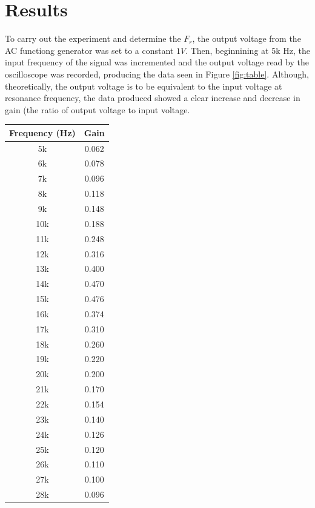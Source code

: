 \documentclass[journal]{IEEEtran}
\begin{document}
\section{Results}

\noindent To carry out the experiment and determine the $F_{r}$, the output voltage from the AC functiong generator was set to a constant $1V$. Then, beginnining at 5k Hz, the input frequency of the signal was incremented and the output voltage read by the oscilloscope was recorded, producing the data seen in Figure \ref{fig:table}. Although, theoretically, the output voltage is to be equivalent to the input voltage at resonance frequency, the data produced showed a clear increase and decrease in gain (the ratio of output voltage to input voltage. 


\begingroup
    \centering
    \medskip
    \def\arraystretch{1.5}
    \begin{tabular}{cc}
    \hline
    Frequency (Hz) & Gain \\
    \hline
    5k & 0.062 \\
    6k & 0.078 \\
    7k & 0.096 \\
    8k & 0.118 \\
    9k & 0.148 \\
    10k & 0.188 \\
    11k & 0.248 \\
    12k & 0.316 \\
    13k & 0.400 \\
    14k & 0.470 \\
    15k & 0.476 \\
    16k & 0.374 \\
    17k & 0.310 \\
    18k & 0.260 \\
    19k & 0.220 \\
    20k & 0.200 \\
    21k & 0.170 \\
    22k & 0.154 \\
    23k & 0.140 \\
    24k & 0.126 \\
    25k & 0.120 \\
    26k & 0.110 \\
    27k & 0.100 \\
    28k & 0.096 \\

    \hline
    \end{tabular}
    \label{fig:table}
    \medskip
\endgroup
\end{document}
